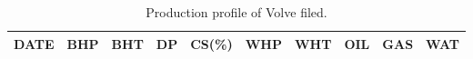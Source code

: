 \documentclass[12pt,a4paper]{report}
\begin{document}
\clearpage
\begin{longtable}[c]{| c | c | c |c |c |c |c |c |c |c |}

 \caption{Production profile of Volve filed.\label{long}}\\
 \toprule
 
 \textbf{DATE} & \textbf{BHP} & \textbf{BHT} & \textbf{DP} & \textbf{CS(\%)} & \textbf{WHP} & \textbf{WHT} & \textbf{OIL} & \textbf{GAS} & \textbf{WAT} \\\midrule
 
 
 

\end{longtable}
\end{document}
